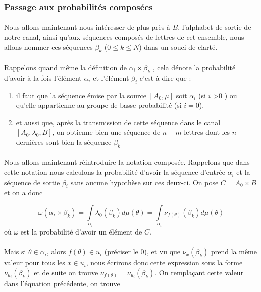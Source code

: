 \subsubsection*{Passage aux probabilités composées}
	
	\paragraph{}
	Nous allons maintenant nous intéresser de plus près à $B$, l'alphabet 
	de sortie de notre canal, ainsi qu'aux séquences composés de lettres de cet
	ensemble, nous allons nommer ces séquences $\beta_k$ ($0 \le k \le N$) dans
	un souci de clarté.
	
	\paragraph{}
	Rappelons quand même la définition de $\alpha_i \times \beta_k$ , cela 
	dénote la probabilité d'avoir à la fois l'élément $\alpha_i$ et 
	l'élément $\beta_i$ c'est-à-dire que :
	\begin{enumerate}
		\item il faut que la séquence émise par la source $[A_0,\mu]$ soit 
			$\alpha_i$ (si $i$ >0 ) ou qu'elle appartienne au groupe de 
			basse probabilité (si $i=0$).
		\item et aussi que, après la transmission de cette séquence dans 
			le canal $[A_0,\lambda_0,B]$, on obtienne bien une séquence 
			de $n+m$ lettres dont les $n$ 
			dernières sont bien la séquence $\beta_k$
	\end{enumerate} 
	
	\paragraph{}
	Nous allons maintenant réintroduire la notation composée. Rappelons que
	dans cette notation nous calculons la probabilité d'avoir la séquence
	d'entrée $\alpha_i$ et la séquence de sortie $\beta_i$ sans aucune 
	hypothèse sur ces deux-ci. On pose $C = A_0 \times B$ et on a donc
	
	
	\[
		\omega(\alpha_i\times\beta_k)=
		\int\limits_{\alpha_i}\lambda_0(\beta_k)d\mu(\theta)=
		\int\limits_{\alpha_i}\nu_{f(\theta)}(\beta_k)d\mu(\theta)
	\]
	où $\omega$ est la probabilité d'avoir un élément de $C$.
	
	\paragraph{}
	Mais si $\theta \in \alpha_i$, alors $f(\theta) \in u_i$ (préciser le 0),
	et vu que $\nu_x(\beta_k)$ prend la même valeur pour tous les $x \in u_i$,
	nous écrirons donc cette expression sous la forme $\nu_{u_i}(\beta_k)$ et
	de suite on trouve $\nu_{f(\theta)}=\nu_{u_i}(\beta_k)$.
	On remplaçant cette valeur dans l'équation précédente, on trouve
	
